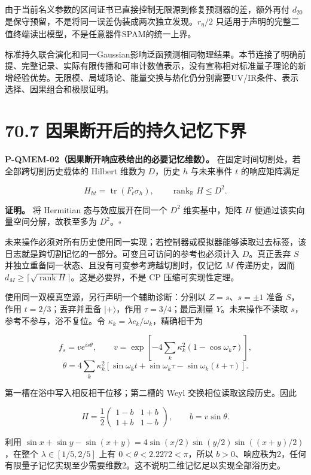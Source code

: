 \documentclass[
  11pt,
  oneside]{book}
\begin{document}
由于当前名义参数的区间证书已直接控制无限源到修复预测器的差，额外再付
\(d_{20}\) 是保守预留，不是将同一误差伪装成两次独立发现。\(r_\eta/2\)
只适用于声明的完整二值终端读出模型，不是任意器件SPAM的统一上界。

标准持久联合演化和同一Gaussian影响泛函预测相同物理结果。本节连接了明确前提、完整记录、实际有限传播和可审计数值表示，没有宣称相对标准量子理论的新增经验优势。无限模、局域场论、能量交换与热化仍分别需要UV/IR条件、表示选择、因果组合和极限证明。

\section{70.7 因果断开后的持久记忆下界}

\protect\hypertarget{p-qmem-02}{}{}
\textbf{P-QMEM-02（因果断开响应秩给出的必要记忆维数）。}
在固定时间切割处，若全部跨切割历史载体的 Hilbert 维数为 \(D\)，历史
\(h\) 与未来事件 \(t\) 的响应矩阵满足

\[
H_{ht}=\operatorname{tr}(F_t\sigma_h),\qquad
\operatorname{rank}_{\mathbb R}H\le D^2.
\tag{70-M}
\]

\textbf{证明。} 将 Hermitian 态与效应展开在同一个 \(D^2\) 维实基中，矩阵
\(H\) 便通过该实向量空间分解，故秩至多为 \(D^2\)。\(\square\)

未来操作必须对所有历史使用同一实现；若控制器或模拟器能够读取过去标签，该日志就是跨切割记忆的一部分。可变且可访问的参考也必须计入
\(D\)。真正丢弃 \(S\)
并独立重备同一状态、且没有可变参考跨越切割时，仅记忆 \(M\)
传递历史，因而
\(d_M\ge\lceil\sqrt{\operatorname{rank}H}\rceil\)。这是必要界，不是 CP
压缩可实现性定理。

使用同一双模真空源，另行声明一个辅助诊断：分别以 \(Z=s\)、\(s=\pm1\)
准备 \(S\)，作用 \(t=2/3\)；丢弃并重备 \(|+\rangle\)，作用
\(\tau=3/4\)；最后测量 \(Y\)。未来操作不读取
\(s\)，参考不参与，浴不复位。令
\(\kappa_k=\lambda c_k/\omega_k\)，精确相干为

\[
f_s=v e^{is\theta},\qquad
v=\exp\!\left[-4\sum_k\kappa_k^2(1-\cos\omega_k\tau)\right],
\] \[
\theta=4\sum_k\kappa_k^2
\left[\sin\omega_k t+\sin\omega_k\tau-\sin\omega_k(t+\tau)\right].
\]

第一槽在浴中写入相反相干位移；第二槽的 Weyl 交换相位读取这段历史。因此

\[
H=\frac12
\begin{pmatrix}1-b&1+b\\1+b&1-b\end{pmatrix},\qquad
b=v\sin\theta.
\]

利用
\(\sin x+\sin y-\sin(x+y)=4\sin(x/2)\sin(y/2)\sin((x+y)/2)\)，在整个
\(\lambda\in[1/5,2/5]\) 上有 \(0<\theta<2.2272<\pi\)，所以
\(b>0\)、响应秩为2，任何有限量子记忆实现至少需要维数2。这不说明二维记忆足以实现全部浴历史。
\end{document}
